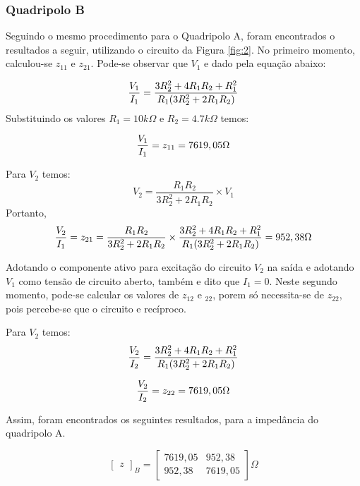 \subsubsection{Quadripolo B} Seguindo o mesmo procedimento para
o Quadripolo A, foram encontrados o resultados a seguir,
utilizando o circuito da Figura \ref{fig:2}.
No primeiro momento, calculou-se $z_{11}$ e $z_{21}$. Pode-se
observar que $V_1$ e dado pela equação abaixo:


\begin{equation}\label{eq:z12}
 {V_1 \over I_1} = \frac{3R_2^2+4R_1R_2+R_1^2}{R_1(3R_2^2+2R_1R_2)} 
\end{equation}
Substituindo os valores $R_1=10k\Omega$ e $R_2=4.7k\Omega$ temos:

\begin{equation}\label{eq:z22}
 {V_1 \over I_1} = z_{11} = 7619,05\Omega
\end{equation}

Para $V_2$ temos:
\begin{equation}\label{eq:z222}
 V_2 = \frac{R_1R_2}{3R_2^2+2R_1R_2}\times V_1
\end{equation}
Portanto,
\begin{equation}\label{eq:z223}
 {V_2 \over I_1} =z_{21}= \frac{R_1R_2}{3R_2^2+2R_1R_2}\times \frac{3R_2^2+4R_1R_2+R_1^2}{R_1(3R_2^2+2R_1R_2)} = 952,38\Omega
\end{equation}

Adotando o componente ativo para excitação do circuito  $V_2$ na saída e adotando $V_1$ como tensão de circuito aberto, também e dito que $I_1 = 0$. Neste segundo momento, pode-se
calcular os valores de $z_{12}$ e $_{22}$, porem só necessita-se de $z_22$, pois percebe-se que o circuito e recíproco.

Para $V_2$ temos:
\begin{equation}\label{eq:z224}
 {V_2 \over I_2} = \frac{3R_2^2+4R_1R_2+R_1^2}{R_1(3R_2^2+2R_1R_2)} 
\end{equation}

\begin{equation}\label{eq:z225}
 {V_2 \over I_2} = z_{22} = 7619,05\Omega
\end{equation}


Assim, foram encontrados os seguintes
resultados, para a impedância do quadripolo A.

\begin{equation}
\left[ \begin{array}{c} z \end{array} \right]_B = 
\begin{bmatrix} 
7619,05 & 952,38 \\
952,38 & 7619,05
\end{bmatrix} 
\Omega
\label{teoA}
\end{equation}


